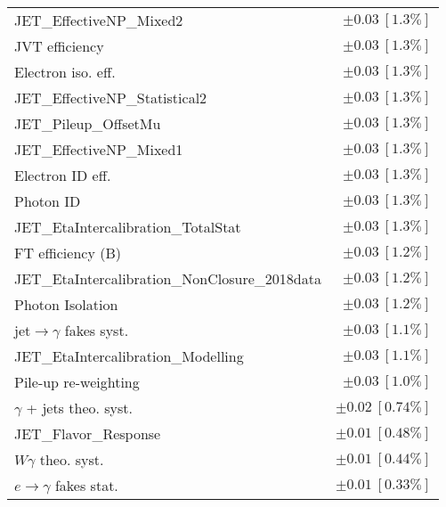 \begin{tabular}{lr}
JET\_EffectiveNP\_Mixed2 & $\pm 0.03\ [1.3\%]$ \\
JVT efficiency & $\pm 0.03\ [1.3\%]$ \\
Electron iso. eff. & $\pm 0.03\ [1.3\%]$ \\
JET\_EffectiveNP\_Statistical2 & $\pm 0.03\ [1.3\%]$ \\
JET\_Pileup\_OffsetMu & $\pm 0.03\ [1.3\%]$ \\
JET\_EffectiveNP\_Mixed1 & $\pm 0.03\ [1.3\%]$ \\
Electron ID eff. & $\pm 0.03\ [1.3\%]$ \\
Photon ID & $\pm 0.03\ [1.3\%]$ \\
JET\_EtaIntercalibration\_TotalStat & $\pm 0.03\ [1.3\%]$ \\
FT efficiency (B) & $\pm 0.03\ [1.2\%]$ \\
JET\_EtaIntercalibration\_NonClosure\_2018data & $\pm 0.03\ [1.2\%]$ \\
Photon Isolation & $\pm 0.03\ [1.2\%]$ \\
jet$\to\gamma$ fakes syst. & $\pm 0.03\ [1.1\%]$ \\
JET\_EtaIntercalibration\_Modelling & $\pm 0.03\ [1.1\%]$ \\
Pile-up re-weighting & $\pm 0.03\ [1.0\%]$ \\
$\gamma$ + jets theo. syst. & $\pm 0.02\ [0.74\%]$ \\
JET\_Flavor\_Response & $\pm 0.01\ [0.48\%]$ \\
$W\gamma$ theo. syst. & $\pm 0.01\ [0.44\%]$ \\
$e\to\gamma$ fakes stat. & $\pm 0.01\ [0.33\%]$ \\
\hline
\end{tabular}
